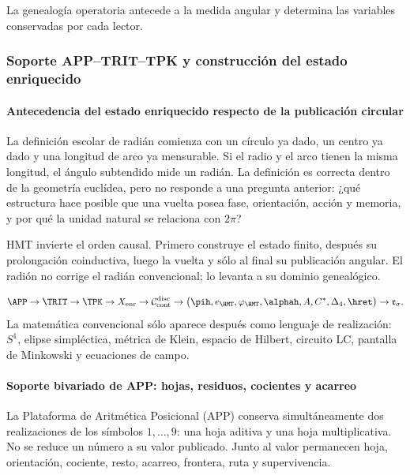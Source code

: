 \noindent La genealogía operatoria antecede a la medida angular y determina las variables conservadas por cada lector.\par\medskip

\subsubsection{Soporte APP--TRIT--TPK y construcción del estado enriquecido}

\paragraph{Antecedencia del estado enriquecido respecto de la publicación circular}

La definición escolar de radián comienza con un círculo ya dado, un centro ya
dado y una longitud de arco ya mensurable. Si el radio y el arco tienen la
misma longitud, el ángulo subtendido mide un radián. La definición es correcta
dentro de la geometría euclídea, pero no responde a una pregunta anterior:
¿qué estructura hace posible que una vuelta posea fase, orientación, acción y
memoria, y por qué la unidad natural se relaciona con \(2\pi\)?

HMT invierte el orden causal. Primero construye el estado finito, después su
prolongación coinductiva, luego la vuelta y sólo al final su publicación
angular. El radión no corrige el radián convencional; lo levanta a su dominio
genealógico.

\begin{typebox}
\[
\APP\to\TRIT\to\TPK\to X_{\mathrm{enr}}
\to\mathcal C^{\mathrm{disc}}_{\mathrm{cont}}
\to\bigl(\pih,e_{\HMT},\varphi_{\HMT},\alphah,A,C^*,\Delta_4,\hret\bigr)
\to\mathfrak r_\sigma.
\]
La matemática convencional sólo aparece después como lenguaje de realización:
\(S^1\), elipse simpléctica, métrica de Klein, espacio de Hilbert, circuito
LC, pantalla de Minkowski y ecuaciones de campo.
\end{typebox}

\paragraph{Soporte bivariado de APP: hojas, residuos, cocientes y acarreo}

La Plataforma de Aritmética Posicional (APP) conserva simultáneamente dos
realizaciones de los símbolos \(1,\dots,9\): una hoja aditiva y una hoja
multiplicativa. No se reduce un número a su valor publicado. Junto al valor
permanecen hoja, orientación, cociente, resto, acarreo, frontera, ruta y
supervivencia.

